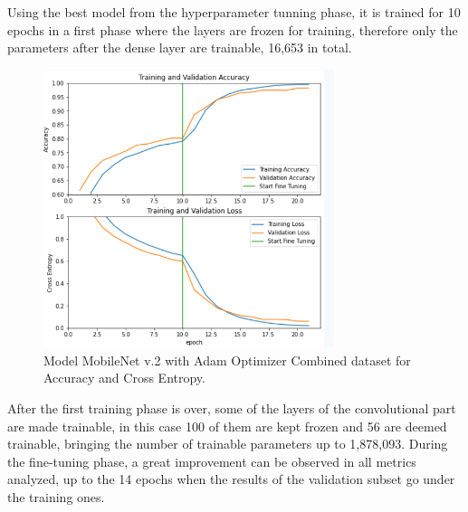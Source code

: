 \documentclass[conference]{IEEEtran}
\begin{document}
Using the best model from the hyperparameter tunning phase, it is trained for 10 epochs in a first phase where the layers are frozen for training, therefore only the parameters after the dense layer are trainable, 16,653 in total.\
\begin{figure}[htbp]
\centerline{\includegraphics[width=8.5cm]{ModelCombineAccCEntropy.png}}
\caption{Model MobileNet v.2 with Adam Optimizer Combined dataset for Accuracy and Cross Entropy.}
\label{fig}
\end{figure}


After the first training phase is over, some of the layers of the convolutional part are made trainable, in this case 100 of them are kept frozen and 56 are deemed trainable, bringing the number of trainable parameters up to 1,878,093. During the fine-tuning phase, a great improvement can be observed in all metrics analyzed, up to the 14 epochs when the results of the validation subset go under the training ones. 
\end{document}
